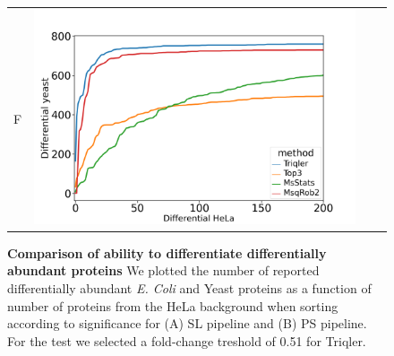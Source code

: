 \documentclass[11pt]{article}
\begin{document}
\begin{figure}[hbt]
\begin{tabular}{lclc}
        F & \includegraphics[width=0.45\linewidth]{../../result/report_plots_pipeline/diff_HeLa_vs_nonHeLa_PS_yeast.png} \\ 

    \end{tabular}
    \caption{{\bf Comparison of ability to differentiate differentially abundant proteins} We plotted the number of reported differentially abundant  {\em E. Coli} and Yeast proteins as a function of number of proteins from the HeLa background when sorting according to significance for (A) SL pipeline and (B) PS pipeline. For the test we selected a fold-change treshold of 0.51 for Triqler. \label{fig:ability_to_differentiate_differentially_abundant_specie_vs_hela}}
\end{figure}

\iffalse
\end{document}
